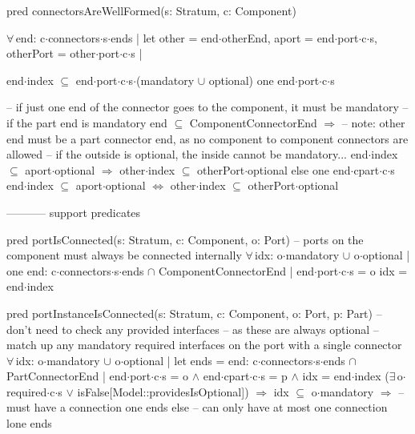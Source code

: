 pred connectorsAreWellFormed(s: Stratum, c: Component)
{
  $\forall\,$end: c$\cdot$connectors$\cdot$s$\cdot$ends |
  let other = end$\cdot$otherEnd, aport = end$\cdot$port$\cdot$c$\cdot$s, otherPort = other$\cdot$port$\cdot$c$\cdot$s |
  {
    end$\cdot$index $\subseteq$ end$\cdot$port$\cdot$c$\cdot$s$\cdot$(mandatory $\cup$ optional)
    one end$\cdot$port$\cdot$c$\cdot$s
    
    -- if just one end of the connector goes to the component, it must be mandatory
    -- if the part end is mandatory
    end $\subseteq$ ComponentConnectorEnd $\Longrightarrow$
    {
      -- note: other end must be a part connector end, as no component to component connectors are allowed
      -- if the outside is optional, the inside cannot be mandatory...
      end$\cdot$index $\subseteq$ aport$\cdot$optional $\Longrightarrow$ other$\cdot$index $\subseteq$ otherPort$\cdot$optional
    }
    else
    {
      one end$\cdot$cpart$\cdot$c$\cdot$s
      end$\cdot$index $\subseteq$ aport$\cdot$optional $\Longleftrightarrow$ other$\cdot$index $\subseteq$ otherPort$\cdot$optional
    }
  }
}



----------- support predicates

pred portIsConnected(s: Stratum, c: Component, o: Port)
{
  -- ports on the component must always be connected internally
  $\forall\,$idx: o$\cdot$mandatory $\cup$ o$\cdot$optional |
  one end: c$\cdot$connectors$\cdot$s$\cdot$ends $\cap$ ComponentConnectorEnd |
  {
    end$\cdot$port$\cdot$c$\cdot$s = o
    idx = end$\cdot$index
  }
}

pred portInstanceIsConnected(s: Stratum, c: Component, o: Port, p: Part)
{
  -- don't need to check any provided interfaces -- as these are always optional
  -- match up any mandatory required interfaces on the port with a single connector
  $\forall\,$idx: o$\cdot$mandatory $\cup$ o$\cdot$optional |
  let ends =
  { end: c$\cdot$connectors$\cdot$s$\cdot$ends $\cap$ PartConnectorEnd |
    end$\cdot$port$\cdot$c$\cdot$s = o $\wedge$ end$\cdot$cpart$\cdot$c$\cdot$s = p $\wedge$ idx = end$\cdot$index
  }
  {
    ($\exists\,$o$\cdot$required$\cdot$c$\cdot$s $\vee$ isFalse[Model::providesIsOptional]) $\Longrightarrow$
    {
      idx $\subseteq$ o$\cdot$mandatory $\Longrightarrow$
        -- must have a connection
        one ends
      else
        -- can only have at most one connection
        lone ends
    }
  }
}

